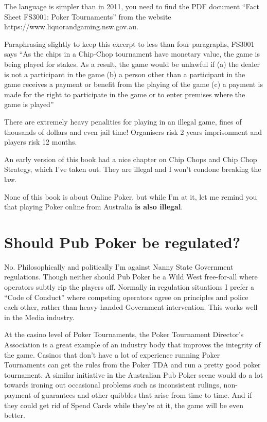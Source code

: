 The language is simpler than in 2011, you need to find
the PDF document ``Fact Sheet FS3001: Poker Tournaments'' from
the website https://www.liquorandgaming.nsw.gov.au.

Paraphrasing slightly to keep this excerpt to less than four paragraphs,
FS3001 says ``As the chips in a Chip-Chop tournament
have monetary value, the game is being played for stakes. As a result,
the game would be unlawful if (a) the dealer is not a participant in the game
(b) a person other than a participant in the game receives a payment
or benefit from the playing of the game (c) a payment is made for the
right to participate in the game or to enter premises where the game
is played''

There are extremely heavy penalities for playing in an illegal game,
fines of thousands of dollars and even jail time!
Organisers risk 2 years imprisonment and players risk 12 months.

An early version of this book had a nice chapter on Chip Chops and
Chip Chop Strategy, which I've taken out. They are illegal and I
won't condone breaking the law.

None of this book is about Online Poker, but while I'm at it,
let me remind you that playing Poker online from Australia
\textbf{is also illegal}.

\section{Should Pub Poker be regulated?}

No. Philosophically and politically I'm against Nanny State
Government regulations. Though neither should Pub Poker
be a Wild West free-for-all where operators subtly rip the players
off. Normally in regulation situations I prefer a ``Code of Conduct''
where competing operators agree on principles and police each other,
rather than heavy-handed Government intervention. This works well
in the Media industry.

At the casino level of Poker Tournaments, the Poker Tournament
Director's Association is a great example of an industry body that
improves the integrity of the game. Casinos that don't have a lot of
experience running Poker Tournaments can get the rules from the Poker
TDA and run a pretty good poker tournament. A similar initiative in the
Australian Pub Poker scene would do a lot towards ironing out
occasional problems such as inconsistent rulings, non-payment of
guarantees and other quibbles that arise from time to time. And if
they could get rid of Spend Cards while they're at it, the game will
be even better.


